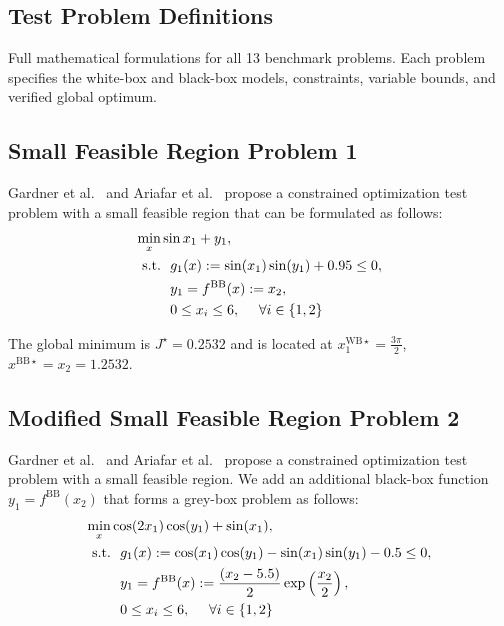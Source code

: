 \documentclass[12pt,a4paper]{article}%
\theoremstyle{plain}%
\theoremstyle{remark}%
\theoremstyle{definition}%
\def\WB{\mathrm{WB}}
\def\BB{\mathrm{BB}}
\begin{document}
\begin{appendices}
\section{Test Problem Definitions}\label{sec:test_problems}

Full mathematical formulations for all 13 benchmark problems. Each problem specifies the white-box and black-box models, constraints, variable bounds, and verified global optimum.

\subsection{Small Feasible Region Problem 1}\label{subsec:app_sfr1}
Gardner et al.~\cite{gardner2014} and Ariafar et al.~\cite{Ariafar2019} propose a constrained optimization test problem with a small feasible region that can be formulated as follows:
\begin{align}
    \min_{x} & \sin{x_1} + y_1, \\\notag
    \text{s.t.} &~~ g_1(x) := \sin(x_1)\sin(y_1) + 0.95 \leq 0, \\\notag
    &~~ y_1 = f^\BB(x) := x_2, \\\notag
    &~~ 0 \leq x_i \leq 6, ~~~~ \forall i \in \{1, 2\}
\end{align}

The global minimum is $J^\star = 0.2532$ and is located at $x^{\WB\star}_1=\frac{3\pi}{2}$, $x^{\BB\star}=x_2=1.2532$.

\subsection{Modified Small Feasible Region Problem 2}\label{subsec:app_sfr2}

Gardner et al.~\cite{gardner2014} and Ariafar et al.~\cite{Ariafar2019} propose a constrained optimization test problem with a small feasible region. We add an additional black-box function $y_1=f^\BB (x_2)$ that forms a grey-box problem as follows:
\begin{align} \label{eq:SmallFeasibleRegion}
    \min_{x} & \cos(2x_1)\cos(y_1) + \sin(x_1), \\\notag
    \text{s.t.} &~~ g_1(x) := \cos(x_1)\cos(y_1) - \sin(x_1)\sin(y_1) - 0.5 \leq 0, \\\notag
    &~~ y_1 = f^\BB(x) := \frac{(x_2 - 5.5)}{2} \exp\left(\frac{x_2}{2}\right), \\\notag
    &~~ 0 \leq x_i \leq 6, ~~~~ \forall i \in \{1, 2\}
\end{align}


\end{appendices}
\end{document}
